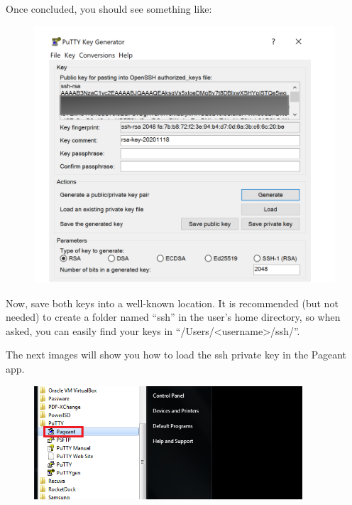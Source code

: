 Once concluded, you should see something like:

\begin{figure}
  \includegraphics[width=13cm]{Images/example10.png}
  \centering
\end{figure}

\vspace{5 mm}
Now, save both keys into a well-known location. It is recommended (but not needed) to create a folder
named “ssh” in the user’s home directory, so when asked, you can easily find your keys in
“/Users/<username>/ssh/”.
\newpage

The next images will show you how to load the ssh private key in the Pageant app.

\begin{figure}
  \includegraphics[width=10cm]{Images/example17.png}
  \centering
\end{figure}
\vspace{5 mm}

